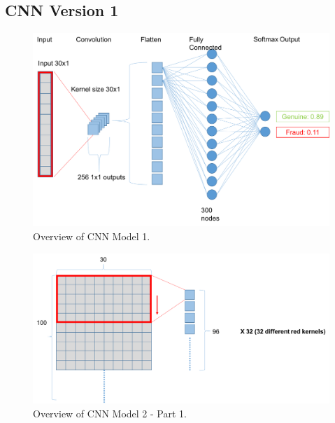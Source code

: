 \documentclass[12pt,a4paper,twoside]{report}
\begin{document}
\subsection{CNN Version 1}
\begin{figure}[H]
\centering
\includegraphics[scale=0.6]{cnnv1}
\caption{Overview of CNN Model 1.}
\label{fig:cnnv1}
\end{figure}

\begin{figure}[H]
\centering
\includegraphics[scale=0.6]{cnnv2-1}
\caption{Overview of CNN Model 2 - Part 1.}
\label{fig:cnnv2-1}
\end{figure}
\end{document}
